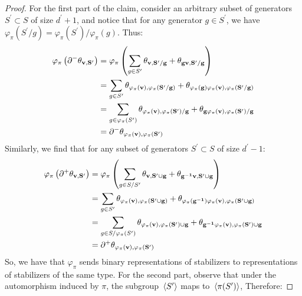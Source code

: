 \begin{proof}
  For the first part of the claim, consider an arbitrary subset of generators $S^{\prime} \subset S$ of size $d^{\prime}+1$, and notice that for any generator $g \in S^{\prime}$, we have $\varphi_{\pi}(S^{\prime}/g) = \varphi_{\pi}(S^{\prime}) / \varphi_{\pi}(g)$. Thus:
\begin{equation*}
  \begin{split}
      \varphi_{\pi} \left( \partial^{-}  \mathbf{\theta_{v ,S^{\prime}} } \right) &=  \varphi_{\pi}\left( \sum_{g\in S^{\prime}} \mathbf{\theta_{v ,S^{\prime}/g} } +  \mathbf{\theta_{gv ,S^{\prime}/g} }  \right) \\
      & = \sum_{g\in S^{\prime}} \mathbf{\theta_{\varphi_{\pi}(v) , \varphi_{\pi}(S^{\prime} / g)} } +  \mathbf{\theta_{\varphi_{\pi}(g)\varphi_{\pi}(v) ,\varphi_{\pi}(S^{\prime} / g) } }  \\ 
      & = \sum_{g\in \varphi_{\pi}(S^{\prime})} \mathbf{\theta_{\varphi_{\pi}(v) , \varphi_{\pi}(S^{\prime})/g} } +  \mathbf{\theta_{g\varphi_{\pi}(v) ,\varphi_{\pi}(S^{\prime})/g } }  \\ 
      &= \partial^{-} \mathbf{\theta_{\varphi_{\pi}(v) ,\varphi_{\pi}(S^{\prime})} }
  \end{split}
\end{equation*}
Similarly, we find that for any subset of generators $S^{\prime} \subset S$ of size $d^{\prime}-1$:
\begin{equation*}
  \begin{split}
    \varphi_{\pi} \left( \partial^{+}  \mathbf{\theta_{v ,S^{\prime}} } \right) &=  \varphi_{\pi}\left( \sum_{g\in S/S^{\prime}} \mathbf{\theta_{v ,S^{\prime} \cup g} } +  \mathbf{\theta_{g^{-1}v ,S^{\prime} \cup g} }  \right) \\
    & = \sum_{g\in S^{\prime}} \mathbf{\theta_{\varphi_{\pi}(v) , \varphi_{\pi}(S^{\prime} \cup g)} } +  \mathbf{\theta_{\varphi_{\pi}(g^{-1})\varphi_{\pi}(v) ,\varphi_{\pi}(S^{\prime} \cup g) } }  \\ 
    & = \sum_{g\in S/\varphi_{\pi}(S^{\prime})} \mathbf{\theta_{\varphi_{\pi}(v) , \varphi_{\pi}(S^{\prime})\cup g} } +  \mathbf{\theta_{g^{-1}\varphi_{\pi}(v) ,\varphi_{\pi}(S^{\prime})\cup g } }  \\ 
      &= \partial^{+} \mathbf{\theta_{\varphi_{\pi}(v) ,\varphi_{\pi}(S^{\prime})} }
  \end{split}
\end{equation*}
So, we have that $\varphi_{\pi}$ sends binary representations of stabilizers to representations of stabilizers of the same type. For the second part, observe that under the automorphism induced by $\pi$, the subgroup $\expval*{S^{\prime}}$ maps to $\expval*{\pi(S^{\prime})}$, Therefore: 

\end{proof}
